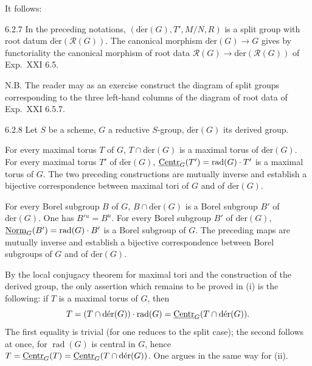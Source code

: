 It follows:
\begin{proposition}{6.2.7}\label{XXII.6.2.7}
In the preceding notations, $(\operatorname{d\acute er}(G),T',M/N,R)$ is a split group with root datum $\operatorname{d\acute er}(\mathscr R(G))$. The canonical morphism $\operatorname{d\acute er}(G)\to G$ gives by functoriality the canonical morphism of root data $\mathscr R(G)\to\operatorname{d\acute er}(\mathscr R(G))$ of Exp.~XXI 6.5.
\end{proposition}
N.B. The reader may as an exercise construct the diagram of split groups corresponding to the three left-hand columns of the diagram of root data of Exp.~XXI 6.5.7.
\begin{proposition}{6.2.8}\label{XXII.6.2.8}
Let $S$ be a scheme, $G$ a reductive $S$-group, $\operatorname{d\acute er}(G)$ its derived group.
\begin{enumeratei}
\item For every maximal torus $T$ of $G$, $T\cap\operatorname{d\acute er}(G)$ is a maximal torus of $\operatorname{d\acute er}(G)$. For every maximal torus $T'$ of $\operatorname{d\acute er}(G)$, $\underline{\mathrm{Centr}}_G(T')=\operatorname{rad}(G)\cdot T'$ is a maximal torus of $G$. The two preceding constructions are mutually inverse and establish a bijective correspondence between maximal tori of $G$ and of $\operatorname{d\acute er}(G)$.
\item For every Borel subgroup $B$ of $G$, $B\cap\operatorname{d\acute er}(G)$ is a Borel subgroup $B'$ of $\operatorname{d\acute er}(G)$. One has $B'{}^u=B^u$. For every Borel subgroup $B'$ of $\operatorname{d\acute er}(G)$, $\underline{\mathrm{Norm}}_G(B')=\operatorname{rad}(G)\cdot B'$ is a Borel subgroup of $G$. The preceding maps are mutually inverse and establish a bijective correspondence between Borel subgroups of $G$ and of $\operatorname{d\acute er}(G)$.
\end{enumeratei}
\end{proposition}
By the local conjugacy theorem for maximal tori and the construction of the derived group, the only assertion which remains to be proved in (i) is the following: if $T$ is a maximal torus of $G$, then
\[
T=(T\cap\operatorname{d\acute er}(G))\cdot\operatorname{rad}(G)=\underline{\mathrm{Centr}}_G(T\cap\operatorname{d\acute er}(G)).
\]
The first equality is trivial (for one reduces to the split case); the second follows at once, for $\operatorname{rad}(G)$ is central in $G$, hence $T=\underline{\mathrm{Centr}}_G(T)=\underline{\mathrm{Centr}}_G(T\cap\operatorname{d\acute er}(G))$. One argues in the same way for (ii).

